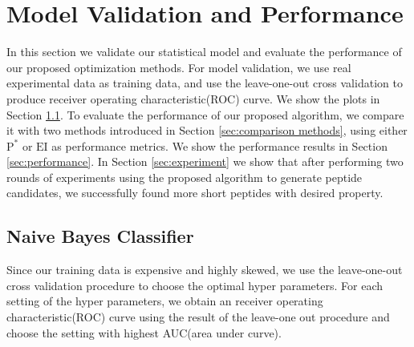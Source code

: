 \documentclass[opre,nonblindrev]{informs3} %
\newcommand{\EI}{\mathrm{EI}}
\newcommand{\PI}{\text{P}^*}
\begin{document}
\section{Model Validation and Performance}
In this section we validate our statistical model and evaluate the performance of our proposed optimization methods. For model validation, we use real experimental data as training data, and use the leave-one-out cross validation to produce receiver operating characteristic(ROC) curve. We show the plots in Section \ref{sec:NB classifier}. To evaluate the performance of our proposed algorithm, we compare it with two methods introduced in Section \ref{sec:comparison methods}, using either $\PI$ or $\EI$ as
performance metrics. We show the performance results in Section \ref{sec:performance}. In Section \ref{sec:experiment} we show that after performing two rounds of experiments using the proposed algorithm to generate peptide candidates, we successfully found more short peptides with desired property.

\subsection{Naive Bayes Classifier} \label{sec:NB classifier}
Since our training data is expensive and highly skewed, we use the leave-one-out cross validation procedure to choose the optimal hyper parameters. For each setting of the hyper parameters, we obtain an receiver operating characteristic(ROC) curve using the result of the leave-one out procedure and choose the setting with highest AUC(area under curve).

\end{document}
